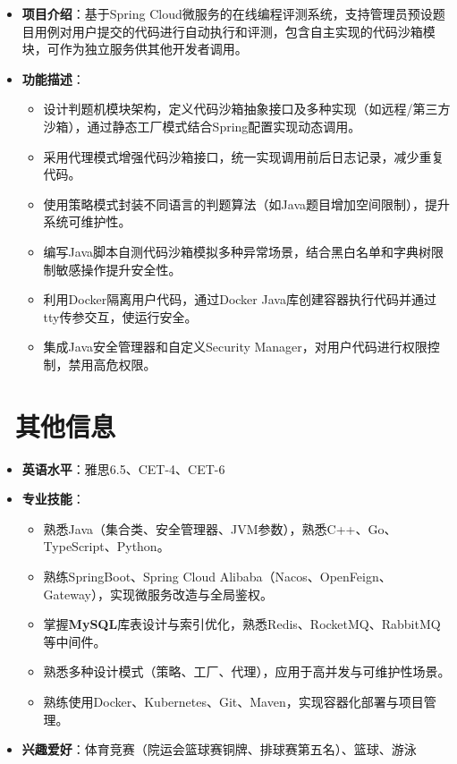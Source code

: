 \documentclass{../../styles/resume}
\begin{document}
\begin{itemize}[leftmargin=*, labelsep=0.5em]
  \item \textbf{项目介绍}：基于Spring Cloud微服务的在线编程评测系统，支持管理员预设题目用例对用户提交的代码进行自动执行和评测，包含自主实现的代码沙箱模块，可作为独立服务供其他开发者调用。
  \item \textbf{功能描述}：
    \begin{itemize}
      \item 设计判题机模块架构，定义代码沙箱抽象接口及多种实现（如远程/第三方沙箱），通过静态工厂模式结合Spring配置实现动态调用。
      \item 采用代理模式增强代码沙箱接口，统一实现调用前后日志记录，减少重复代码。
      \item 使用策略模式封装不同语言的判题算法（如Java题目增加空间限制），提升系统可维护性。
      \item 编写Java脚本自测代码沙箱模拟多种异常场景，结合黑白名单和字典树限制敏感操作提升安全性。
      \item 利用Docker隔离用户代码，通过Docker Java库创建容器执行代码并通过tty传参交互，使运行安全。
      \item 集成Java安全管理器和自定义Security Manager，对用户代码进行权限控制，禁用高危权限。
    \end{itemize}
\end{itemize}

\section{\faInfo\ 其他信息}
\begin{itemize}
  \item \textbf{英语水平}：雅思6.5、CET-4、CET-6
  \item \textbf{专业技能}：
    \begin{itemize}
      \item 熟悉Java（集合类、安全管理器、JVM参数），熟悉C++、Go、TypeScript、Python。 %
      \item 熟练SpringBoot、Spring Cloud Alibaba（Nacos、OpenFeign、Gateway），实现微服务改造与全局鉴权。 %
      \item 掌握\textbf{MySQL}库表设计与索引优化，熟悉Redis、RocketMQ、RabbitMQ等中间件。 %
      \item 熟悉多种设计模式（策略、工厂、代理），应用于高并发与可维护性场景。 %
      \item 熟练使用Docker、Kubernetes、Git、Maven，实现容器化部署与项目管理。 %
    \end{itemize}
    \item \textbf{兴趣爱好}：体育竞赛（院运会篮球赛铜牌、排球赛第五名）、篮球、游泳
\end{itemize}
\end{document}
